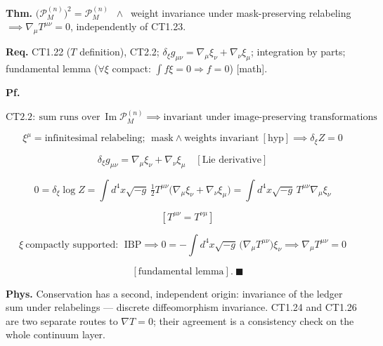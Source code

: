 \begin{theorem}\label{tag:CT1-26}
\textbf{Thm.} $\bigl(\mathcal P_M^{(n)}\bigr)^2=\mathcal P_M^{(n)}$ $\ \wedge\ $ weight invariance under mask-preserving relabeling $\implies\nabla_\mu T^{\mu\nu}=0$, independently of CT1.23.

\textbf{Req.} CT1.22 ($T$ definition), CT2.2; $\delta_\xi g_{\mu\nu}=\nabla_\mu\xi_\nu+\nabla_\nu\xi_\mu$; integration by parts; fundamental lemma ($\forall\xi$ compact: $\int f\xi=0\Rightarrow f=0$) [math].

\textbf{Pf.}

\[
\mathrm{CT2.2}:\ \text{sum runs over}\ \operatorname{Im}\mathcal P_M^{(n)}\implies\text{invariant under image-preserving transformations}
\]

\[
\xi^\mu=\text{infinitesimal relabeling};\ \ \text{mask}\wedge\text{weights invariant}\ [\text{hyp}]\implies\delta_\xi Z=0
\]

\[
\delta_\xi g_{\mu\nu}=\nabla_\mu\xi_\nu+\nabla_\nu\xi_\mu\quad[\text{Lie derivative}]
\]

\[
0=\delta_\xi\log Z=\int d^4x\sqrt{-g}\,\tfrac12T^{\mu\nu}\bigl(\nabla_\mu\xi_\nu+\nabla_\nu\xi_\mu\bigr)=\int d^4x\sqrt{-g}\,T^{\mu\nu}\nabla_\mu\xi_\nu
\]

\[
\quad [T^{\mu\nu}=T^{\nu\mu}]
\]

\[
\xi\ \text{compactly supported}:\ \ \text{IBP}\implies0=-\int d^4x\sqrt{-g}\,\bigl(\nabla_\mu T^{\mu\nu}\bigr)\xi_\nu\implies\nabla_\mu T^{\mu\nu}=0
\]

\[
\quad [\text{fundamental lemma}].\ \blacksquare
\]

\textbf{Phys.} Conservation has a second, independent origin: invariance of the ledger sum under relabelings — discrete diffeomorphism invariance. CT1.24 and CT1.26 are two separate routes to $\nabla T=0$; their agreement is a consistency check on the whole continuum layer.

\end{theorem}

